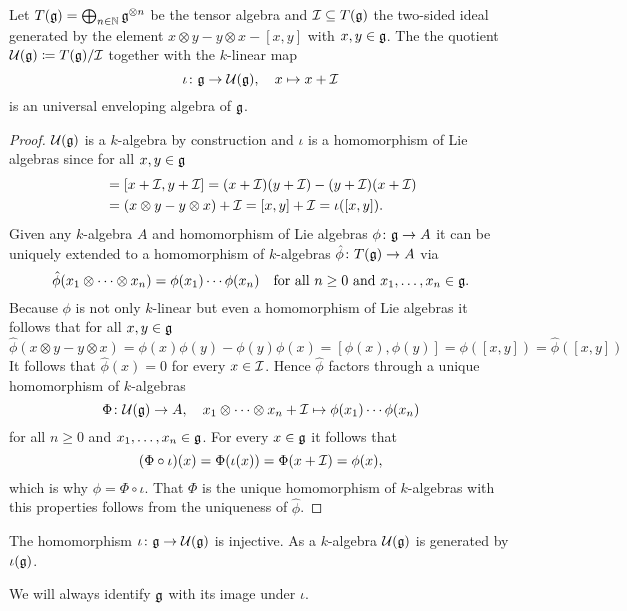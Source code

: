 \begin{lem}
 Let $T(\mathfrak{g}) = \bigoplus_{n \in \mathbb{N}} \mathfrak{g}^{\otimes n}$ be the tensor algebra and $\mathcal{I} \subseteq T(\mathfrak{g})$ the two-sided ideal generated by the element $x \otimes y - y \otimes x - [x,y]$ with $x,y \in \mathfrak{g}$. The the quotient $\mathcal{U}(\mathfrak{g}) \coloneqq T(\mathfrak{g})/\mathcal{I}$ together with the $k$-linear map
 \[
  \iota \colon \mathfrak{g} \to \mathcal{U}(\mathfrak{g}), \quad x \mapsto x + \mathcal{I}
 \]
 is an universal enveloping algebra of $\mathfrak{g}$.
\end{lem}
\begin{proof}
 $\mathcal{U}(\mathfrak{g})$ is a $k$-algebra by construction and $\iota$ is a homomorphism of Lie algebras since for all $x,y \in \mathfrak{g}$
 \begin{align*}
  [\iota(x),\iota(y)]
  &= [x + \mc{I}, y + \mc{I}]
  = (x + \mc{I})(y + \mc{I}) - (y + \mc{I})(x + \mc{I}) \\
  &= (x \otimes y - y \otimes x) + \mc{I}
  = [x,y] + \mc{I}
  = \iota([x,y]).
 \end{align*}
 Given any $k$-algebra $A$ and homomorphism of Lie algebras $\phi \colon \mathfrak{g} \to A$ it can be uniquely extended to a homomorphism of $k$-algebras $\hat{\phi} \colon T(\mathfrak{g}) \to A$ via
 \[
  \hat{\phi}(x_1 \otimes \dotsb \otimes x_n) = \phi(x_1) \dotsm \phi(x_n)
  \quad \text{for all $n \geq 0$ and $x_1, \dotsc, x_n \in \mathfrak{g}$}.
 \]
 Because $\phi$ is not only $k$-linear but even a homomorphism of Lie algebras it follows that for all $x,y \in \mathfrak{g}$
 \[
  \hat{\phi}(x \otimes y - y \otimes x)
  = \phi(x)\phi(y) - \phi(y)\phi(x)
  = [\phi(x),\phi(y)]
  = \phi([x,y])
  = \hat{\phi}([x,y])
 \]
 It follows that $\hat{\phi}(x) = 0$ for every $x \in \mathcal{I}$. Hence $\hat{\phi}$ factors through a unique homomorphism of $k$-algebras
 \[
  \Phi \colon \mathcal{U}(\mathfrak{g}) \to A, \quad
  x_1 \otimes \dotsb \otimes x_n + \mathcal{I} \mapsto \phi(x_1) \dotsm \phi(x_n)
 \]
 for all $n \geq 0$ and $x_1, \dotsc, x_n \in \mathfrak{g}$. For every $x \in \mathfrak{g}$ it follows that
 \[
  (\Phi \circ \iota)(x)
  = \Phi(\iota(x))
  = \Phi(x + \mathcal{I}) 
  = \phi(x),
 \]
 which is why $\phi = \Phi \circ \iota$. That $\Phi$ is the unique homomorphism of $k$-algebras with this properties follows from the uniqueness of $\hat{\phi}$.
\end{proof}


\begin{cor}
 The homomorphism $\iota \colon \mathfrak{g} \to \mathcal{U}(\mathfrak{g})$ is injective. As a $k$-algebra $\mathcal{U}(\mathfrak{g})$ is generated by $\iota(\mathfrak{g})$.
\end{cor}


\begin{rem}
 We will always identify $\mathfrak{g}$ with its image under $\iota$.
\end{rem}





